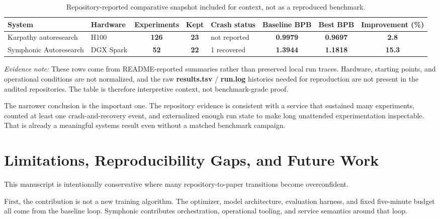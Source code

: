 \documentclass[conference]{IEEEtran}
\newcommand{\file}[1]{{\ttfamily\bfseries\textcolor{accentteal}{#1}}}
\newcommand{\symnum}[1]{\textcolor{accentteal}{\textbf{#1}}}
\newcommand{\basenum}[1]{\textbf{#1}}
\begin{document}
\begin{table}[t]
\caption{Repository-reported comparative snapshot included for context, not as a reproduced benchmark.}
\label{tab:bench}
\centering
\footnotesize
\renewcommand{\arraystretch}{1.08}
\begin{tabularx}{\textwidth}{p{} p{} c c p{} c c c}
\toprule
System & Hardware & {Experiments} & {Kept} & {Crash status} & {Baseline BPB} & {Best BPB} & {Improvement (\%)} \\
\midrule
Karpathy autoresearch & H100 & \basenum{126} & \basenum{23} & not reported & \basenum{0.9979} & \basenum{0.9697} & \basenum{2.8} \\
Symphonic Autoresearch & DGX Spark & \symnum{52} & \symnum{22} & \textcolor{accentteal}{1 recovered} & \symnum{1.3944} & \symnum{1.1818} & \symnum{15.3} \\
\bottomrule
\end{tabularx}
\vspace{0.25em}

\raggedright\scriptsize\emph{Evidence note:} These rows come from README-reported summaries rather than preserved local run traces. Hardware, starting points, and operational conditions are not normalized, and the raw \file{results.tsv} / \file{run.log} histories needed for reproduction are not present in the audited repositories. The table is therefore interpretive context, not benchmark-grade proof.
\end{table}

The narrower conclusion is the important one. The repository evidence is consistent with a service that sustained many experiments, counted at least one crash-and-recovery event, and externalized enough run state to make long unattended experimentation inspectable. That is already a meaningful systems result even without a matched benchmark campaign.

\section{Limitations, Reproducibility Gaps, and Future Work}
This manuscript is intentionally conservative where many repository-to-paper transitions become overconfident.

First, the contribution is not a new training algorithm. The optimizer, model architecture, evaluation harness, and fixed five-minute budget all come from the baseline loop. Symphonic contributes orchestration, operational tooling, and service semantics around that loop.
\end{document}
